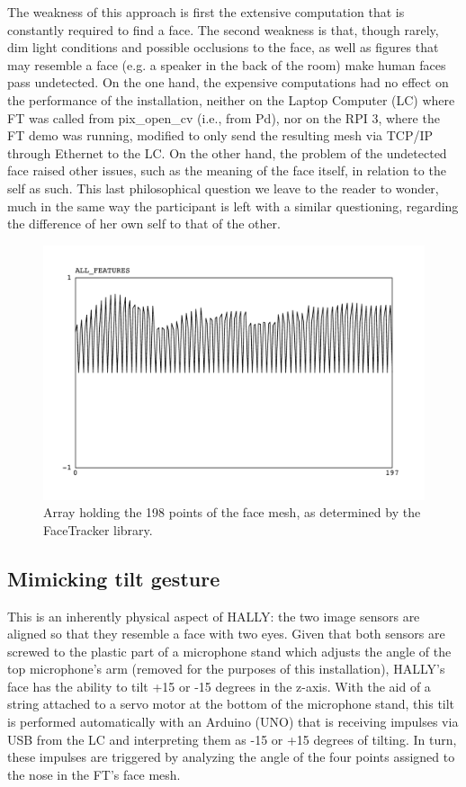 \documentclass{nime-alternate}
\begin{document}
The weakness of this approach is first the extensive computation that is constantly required to find a face. The second weakness is that, though rarely, dim light conditions and possible occlusions to the face, as well as figures that may resemble a face (e.g. a speaker in the back of the room) make human faces pass undetected. On the one hand, the expensive computations had no effect on the performance of the installation, neither on the Laptop Computer (LC) where FT was called from pix\_open\_cv (i.e., from Pd), nor on the RPI 3, where the FT demo was running, modified to only send the resulting mesh via TCP/IP through Ethernet to the LC. On the other hand, the problem of the undetected face raised other issues, such as the meaning of the face itself, in relation to the self as such. This last philosophical question we leave to the reader to wonder, much in the same way the participant is left with a similar questioning, regarding the difference of her own self to that of the other.

\begin{figure}[htbp]
    \centering
        \includegraphics[width=1\columnwidth]{ALL_FEATURES}
    \caption{Array holding the 198 points of the face mesh, as determined by the FaceTracker library.}
    \label{fig:ALL_FEATURES}
\end{figure}

\subsection{Mimicking tilt gesture }
\label{sec:mimicking}
This is an inherently physical aspect of HALLY: the two image sensors are aligned so that they resemble a face with two eyes. Given that both sensors are screwed to the plastic part of a microphone stand which adjusts the angle of the top microphone's arm (removed for the purposes of this installation), HALLY's face has the ability to tilt +15 or -15 degrees in the z-axis. With the aid of a string attached to a servo motor at the bottom of the microphone stand, this tilt is performed automatically with an Arduino (UNO) that is receiving impulses via USB from the LC and interpreting them as -15 or +15 degrees of tilting. In turn, these impulses are triggered by analyzing the angle of the four points assigned to the nose in the FT's face mesh. 
\end{document}
